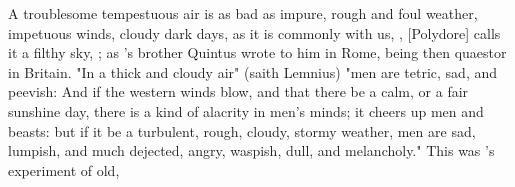 A troublesome tempestuous air is as bad as impure, rough and foul weather,
impetuous winds, cloudy dark days, as it is commonly with us, , [Polydore] calls it a
filthy sky, ; as \Tully{}'s brother Quintus
wrote to him in Rome, being then quaestor in Britain. "In a thick and cloudy
air" (saith Lemnius) "men are tetric, sad, and peevish: And if the western
winds blow, and that there be a calm, or a fair sunshine day, there is a kind
of alacrity in men's minds; it cheers up men and beasts: but if it be a
turbulent, rough, cloudy, stormy weather, men are sad, lumpish, and much
dejected, angry, waspish, dull, and melancholy." This was
\Virgil{}'s experiment of old,


